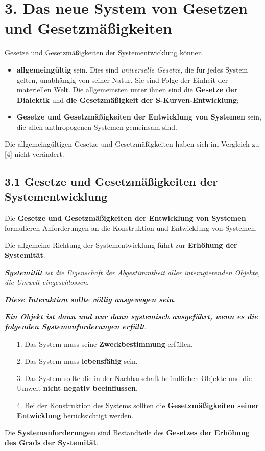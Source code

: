 \documentclass[11pt,a4paper]{article}
\begin{document}
\section{3. Das neue System von Gesetzen und Gesetzmäßigkeiten}
Gesetze und Gesetzmäßigkeiten der Systementwicklung können 
\begin{itemize}
\item \textbf{allgemeingültig} sein. Dies sind \emph{universelle Gesetze}, die
  für jedes System gelten, unabhängig von seiner Natur. Sie sind Folge der
  Einheit der materiellen Welt.  Die allgemeinsten unter ihnen sind die
  \textbf{Gesetze der Dialektik} und \textbf{die Gesetzmäßigkeit der
    S-Kurven-Entwicklung};
\item \textbf{Gesetze und Gesetzmäßigkeiten der Entwicklung von Systemen}
  sein, die allen anthropogenen Systemen gemeinsam sind.
\end{itemize}
Die allgemeingültigen Gesetze und Gesetzmäßigkeiten haben sich im Vergleich zu
[4] nicht verändert.

\subsection{3.1 Gesetze und Gesetzmäßigkeiten der Systementwicklung}

Die \textbf{Gesetze und Gesetzmäßigkeiten der Entwicklung von Systemen}
formulieren Anforderungen an die Konstruktion und Entwicklung von Systemen.

Die allgemeine Richtung der Systementwicklung führt zur \textbf{Erhöhung der
  Systemität}.

\emph{\textbf{Systemität} ist die Eigenschaft der Abgestimmtheit aller
  interagierenden Objekte, die Umwelt eingeschlossen}.

\textbf{\emph{Diese Interaktion sollte völlig ausgewogen sein}}.

\textbf{\emph{Ein Objekt ist dann und nur dann systemisch ausgeführt, wenn es
    die folgenden Systemanforderungen erfüllt}}.
\begin{itemize}[noitemsep]
\item[1.] Das System muss seine \textbf{Zweckbestimmung} erfüllen.
\item[2.] Das System muss \textbf{lebensfähig} sein.
\item[3.] Das System sollte die in der Nachbarschaft befindlichen Objekte
  und die Umwelt \textbf{nicht negativ beeinflussen}.
\item[4.] Bei der Konstruktion des Systems sollten die
  \textbf{Gesetzmäßigkeiten seiner Entwicklung} berücksichtigt werden.
\end{itemize}
Die \textbf{Systemanforderungen} sind Bestandteile des \textbf{Gesetzes der
  Erhöhung des Grads der Systemität}.
\end{document}
